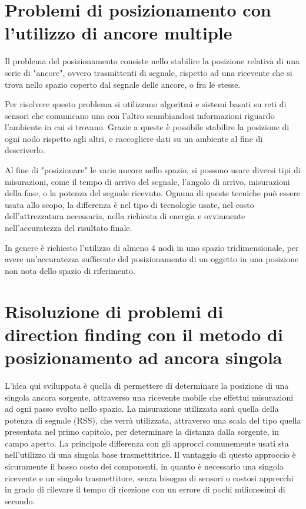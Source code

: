 \section{Problemi di posizionamento con l'utilizzo di ancore multiple}
Il problema del posizionamento consiste nello stabilire la posizione relativa di una serie di "ancore", ovvero trasmittenti di segnale, rispetto ad una ricevente che si trova nello spazio coperto dal segnale delle ancore, o fra le stesse. 

Per risolvere questo problema si utilizzano algoritmi e sistemi basati su reti di sensori che comunicano uno con l'altro scambiandosi informazioni riguardo l'ambiente in cui si trovano. Grazie a queste è possibile stabilire la posizione di ogni nodo rispetto agli altri, e raccogliere dati su un ambiente al fine di descriverlo.

Al fine di "posizionare" le varie ancore nello spazio, si possono usare diversi tipi di misurazioni, come il tempo di arrivo del segnale, l'angolo di arrivo, misurazioni della fase, o la potenza del segnale ricevuto. Ognuna di queste tecniche può essere usata allo scopo, la differenza è nel tipo di tecnologie usate, nel costo dell'attrezzatura necessaria, nella richiesta di energia e ovviamente nell'accuratezza del risultato finale.

In genere è richiesto l'utilizzo di almeno 4 nodi in uno spazio tridimensionale, per avere un'accuratezza sufficente del posizionamento di un oggetto in una posizione non nota dello spazio di riferimento. 
	
\section{Risoluzione di problemi di direction finding con il metodo di posizionamento ad ancora singola}
L'idea  qui sviluppata è quella di permettere di determinare la posizione di una singola ancora sorgente, attraverso una ricevente mobile che effettui misurazioni ad ogni passo svolto nello spazio. La misurazione utilizzata sarà quella della potenza di segnale (RSS), che verrà utilizzata, attraverso una scala del tipo quella presentata nel primo capitolo, per determinare la distanza dalla sorgente, in campo aperto.
La principale differenza con gli approcci comunemente usati sta nell'utilizzo di una singola base trasmettitrice. 
Il vantaggio di questo approccio è sicuramente il basso costo dei componenti, in quanto è necessario una singola ricevente e un singolo trasmettitore, senza bisogno di sensori o costosi apprecchi in grado di rilevare il tempo di ricezione con un errore di pochi milionesimi di secondo.

